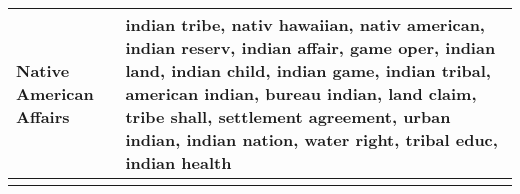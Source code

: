 \begin{longtable}{p{}p{}}
   \hline
Native American Affairs & indian tribe, nativ hawaiian, nativ american, indian reserv, indian affair, game oper, indian land, indian child, indian game, indian tribal, american indian, bureau indian, land claim, tribe shall, settlement agreement, urban indian, indian nation, water right, tribal educ, indian health \\ 
   \hline
\hline
\label{tab:top20_minor}
\end{longtable}
\endgroup
